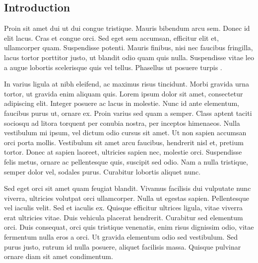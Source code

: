 \begin{refsection}
\newpage
\AddLabels
\section{Introduction}

\vspace{-0.5em}

Proin sit amet dui ut dui congue tristique. Mauris bibendum arcu sem. Donec id elit lacus. Cras et congue orci. Sed eget sem accumsan, efficitur elit et, ullamcorper quam. Suspendisse potenti. Mauris finibus, nisi nec faucibus fringilla, lacus tortor porttitor justo, ut blandit odio quam quis nulla. Suspendisse vitae leo a augue lobortis scelerisque quis vel tellus. Phasellus ut posuere turpis \cite{example1}.

In varius ligula at nibh eleifend, ac maximus risus tincidunt. Morbi gravida urna tortor, ut gravida enim aliquam quis. Lorem ipsum dolor sit amet, consectetur adipiscing elit. Integer posuere ac lacus in molestie. Nunc id ante elementum, faucibus purus ut, ornare ex. Proin varius sed quam a semper. Class aptent taciti sociosqu ad litora torquent per conubia nostra, per inceptos himenaeos. Nulla vestibulum mi ipsum, vel dictum odio cursus sit amet. Ut non sapien accumsan orci porta mollis. Vestibulum sit amet arcu faucibus, hendrerit nisl et, pretium tortor. Donec at sapien laoreet, ultricies sapien nec, molestie orci. Suspendisse felis metus, ornare ac pellentesque quis, suscipit sed odio. Nam a nulla tristique, semper dolor vel, sodales purus. Curabitur lobortis aliquet nunc.

Sed eget orci sit amet quam feugiat blandit. Vivamus facilisis dui vulputate nunc viverra, ultricies volutpat orci ullamcorper. Nulla ut egestas sapien. Pellentesque vel iaculis velit. Sed et iaculis ex. Quisque efficitur ultrices ligula, vitae viverra erat ultricies vitae. Duis vehicula placerat hendrerit. Curabitur sed elementum orci. Duis consequat, orci quis tristique venenatis, enim risus dignissim odio, vitae fermentum nulla eros a orci. Ut gravida elementum odio sed vestibulum. Sed purus justo, rutrum id nulla posuere, aliquet facilisis massa. Quisque pulvinar ornare diam sit amet condimentum.


\newpage

\vspace{-1em}


\end{refsection}
